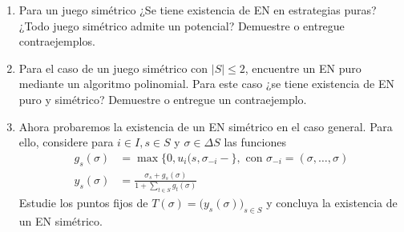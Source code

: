 \documentclass[11pt, spanish]{article}
\theoremstyle{plain}
\begin{document}
\begin{itemize}
  \begin{enumerate}
    \item Para un juego sim\'etrico ¿Se tiene existencia de EN en
      estrategias puras? ¿Todo juego sim\'etrico admite un potencial?
      Demuestre o entregue contraejemplos.
    \item Para el caso de un juego sim\'etrico con $|S|\leq 2$,
      encuentre un EN puro mediante un algoritmo polinomial. Para
      este caso ¿se tiene existencia de EN puro y sim\'etrico?
      Demuestre o entregue un contraejemplo.
    \item Ahora probaremos la existencia de un EN sim\'etrico en
      el caso general. Para ello, considere para $i\in I, s\in S$ y
      $\sigma \in \Delta S$ las funciones
      \begin{align*}
	g_s(\sigma) & =  \max \big\{0, u_i(s,\sigma_{-i} -  \big\}, \text{ con } \sigma_{-i}=(\sigma,\dots,\sigma)\\
	y_s(\sigma) & = \frac{\sigma_s+g_s(\sigma)}{1+ \sum_{t\in S} g_t(\sigma)}
      \end{align*}
      Estudie los puntos fijos de $T(\sigma)= \big( y_s(\sigma)\big)_{s\in S}$ y concluya la existencia de
      un EN sim\'etrico.
  \end{enumerate}
  

\end{itemize}
\end{document}
